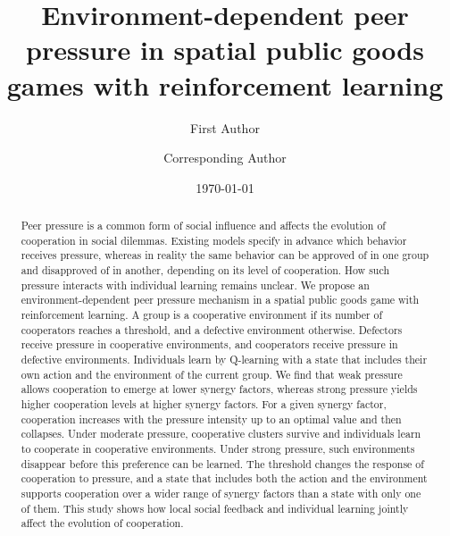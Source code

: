 \documentclass[%
  aip,cha,
  amsmath,amssymb,
  reprint,
  floatfix,
  article-title,
]{revtex4-2}
\begin{document}
\title[Environment-dependent peer pressure with reinforcement learning]{Environment-dependent peer pressure in spatial public goods games with reinforcement learning}

\author{First Author}
\author{Corresponding Author}

\date{\today}

\begin{abstract}
Peer pressure is a common form of social influence and affects the evolution of cooperation in social dilemmas. Existing models specify in advance which behavior receives pressure, whereas in reality the same behavior can be approved of in one group and disapproved of in another, depending on its level of cooperation. How such pressure interacts with individual learning remains unclear. We propose an environment-dependent peer pressure mechanism in a spatial public goods game with reinforcement learning. A group is a cooperative environment if its number of cooperators reaches a threshold, and a defective environment otherwise. Defectors receive pressure in cooperative environments, and cooperators receive pressure in defective environments. Individuals learn by Q-learning with a state that includes their own action and the environment of the current group. We find that weak pressure allows cooperation to emerge at lower synergy factors, whereas strong pressure yields higher cooperation levels at higher synergy factors. For a given synergy factor, cooperation increases with the pressure intensity up to an optimal value and then collapses. Under moderate pressure, cooperative clusters survive and individuals learn to cooperate in cooperative environments. Under strong pressure, such environments disappear before this preference can be learned. The threshold changes the response of cooperation to pressure, and a state that includes both the action and the environment supports cooperation over a wider range of synergy factors than a state with only one of them. This study shows how local social feedback and individual learning jointly affect the evolution of cooperation.
\end{abstract}

\maketitle
\end{document}
